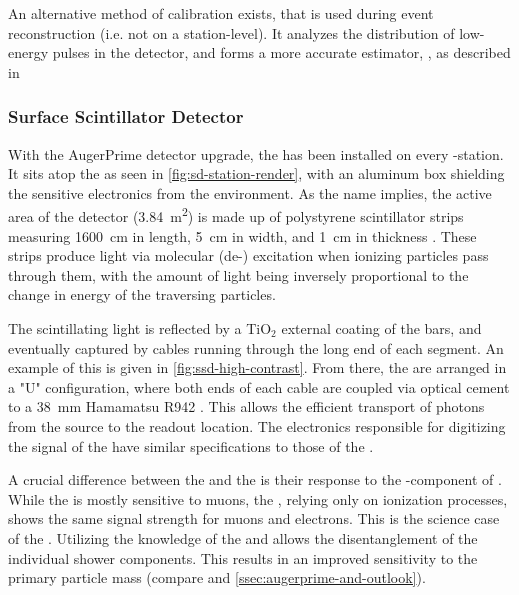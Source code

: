 An alternative method of calibration exists, that is used during event 
reconstruction (i.e. not on a station-level). It analyzes the distribution of 
low-energy pulses in the detector, and forms a more accurate estimator, 
\VemOffline, as described in 

\subsubsection{Surface Scintillator Detector}
\label{sssec:ssd}

With the AugerPrime detector upgrade, the \SSD has been installed on every 
\SD-station. It sits atop the \WCD as seen in \cref{fig:sd-station-render}, 
with an aluminum box shielding the sensitive electronics from the environment. 
As the name implies, the active area of the detector 
(\SI{3.84}{\meter\squared}) is made up of polystyrene scintillator strips 
measuring \SI{1600}{\centi\meter} in length, \SI{5}{\centi\meter} in width, and
\SI{1}{\centi\meter} in thickness \cite{cataldiUpgradePierreAuger2022}. These 
strips produce light via molecular (de-) excitation when ionizing particles 
pass through them, with the amount of light being inversely proportional to the
change in energy of the traversing particles.

The scintillating light is reflected by a TiO$_2$ external coating of the bars,
and eventually captured by \WLS cables running through the long end of each 
segment. An example of this is given in \cref{fig:ssd-high-contrast}. From 
there, the \WLSs are arranged in a "U" configuration, where both ends of each 
cable are coupled via optical cement to a \SI{38}{\milli\meter} Hamamatsu R942 
\PMT \cite{hamamatsuphotonicsPhotomultiplierTubeR9420}. This allows the 
efficient transport of photons from the source to the readout location. The
electronics responsible for digitizing the signal of the \SSD \PMT have similar
specifications to those of the \WCD 
\cite{collaborationPierreAugerObservatory2016}.

A crucial difference between the \WCD and the \SSD is their response to the 
\EM-component of \EASs. While the \WCD is mostly sensitive to muons, the \SSD,
relying only on ionization processes, shows the same signal strength for muons
and electrons. This is the science case of the \SSD. Utilizing the knowledge of
the \WCD and \SSD allows the disentanglement of the individual shower 
components. This results in an improved sensitivity to the primary particle
mass (compare  and 
\cref{ssec:augerprime-and-outlook}).

